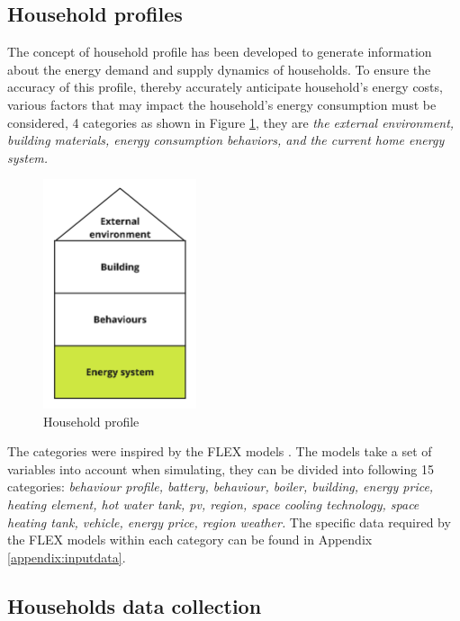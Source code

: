 \subsection{Household profiles}

The concept of household profile has been developed to generate information about the energy demand and supply dynamics of households. 
To ensure the accuracy of this profile, thereby accurately anticipate household's energy costs, 
various factors that may impact the household's energy consumption must be considered, 4 categories as shown in Figure \ref{fig:profile}, they are 
\emph{the external environment, building materials, energy consumption behaviors, and the current home energy system.}

\begin{figure}[h]
  \centering
  \includegraphics[width=0.4\textwidth]{Images/household_profile.jpg}
  \caption{Household profile}
  \label{fig:profile}
\end{figure}

The categories were inspired by the FLEX models \cite{newtrends}.
The models take a set of variables into account when simulating, they can be divided into following 15 categories: 
\emph{
    behaviour profile,
    battery,
    behaviour, 
    boiler,
    building,
    energy price,
    heating element, 
    hot water tank,
    \gls{pv},
    region,
    space cooling technology,
    space heating tank,
    vehicle,
    energy price,
    region weather. 
}
The specific data required by the FLEX models within each category can be found in Appendix \ref{appendix:inputdata}. 


\subsection{Households data collection}

